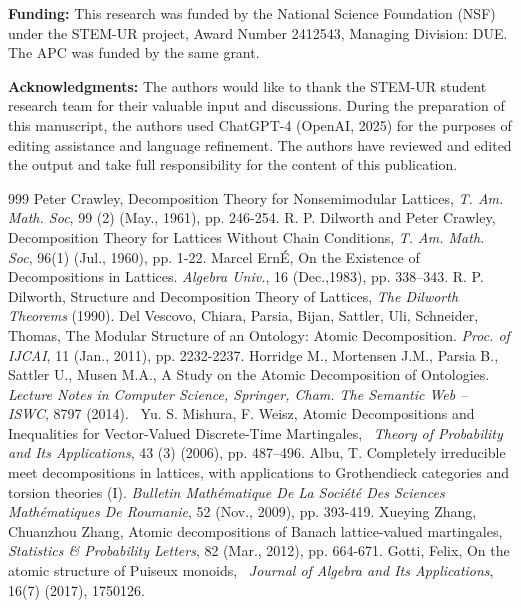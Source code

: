 \documentclass[12pt]{extarticle}
\begin{document}
\noindent\textbf{Funding: }This research was funded by the National Science Foundation (NSF) under the STEM-UR project, Award Number 2412543, Managing Division: DUE. The APC was funded by the same grant.

\noindent\textbf{Acknowledgments:}	The authors would like to thank the STEM-UR student research team for their valuable input and discussions. During the preparation of this manuscript, the authors used ChatGPT-4 (OpenAI, 2025) for the purposes of editing assistance and language refinement. The authors have reviewed and edited the output and take full responsibility for the content of this publication.


\begin{thebibliography}{999}
 Peter Crawley, Decomposition Theory for Nonsemimodular Lattices, \textit{T. Am. Math. Soc}, 99 (2) (May., 1961), pp. 246-254.
 R. P. Dilworth and Peter Crawley, Decomposition Theory for Lattices Without Chain Conditions, \textit{T. Am. Math. Soc}, 96(1) (Jul., 1960), pp. 1-22.
 Marcel ErnÉ, On the Existence of Decompositions in Lattices. \textit{Algebra Univ.}, 16 (Dec.,1983), pp. 338–343.
 R. P. Dilworth, Structure and Decomposition Theory of Lattices, \textit{The Dilworth Theorems} (1990).
 Del Vescovo, Chiara, Parsia, Bijan, Sattler, Uli, Schneider, Thomas, The Modular Structure of an Ontology: Atomic Decomposition. \textit{ Proc. of IJCAI}, 11 (Jan., 2011), pp. 2232-2237.
 Horridge M., Mortensen J.M., Parsia B., Sattler U., Musen M.A., A Study on the Atomic Decomposition of Ontologies. \textit{Lecture Notes in Computer Science, Springer, Cham. The Semantic Web – ISWC}, 8797 (2014). 
 Yu. S. Mishura, F. Weisz, Atomic Decompositions and Inequalities for Vector-Valued Discrete-Time Martingales,  \textit{Theory of Probability and Its Applications},  43 (3) (2006), pp. 487–496.
 Albu, T. Completely irreducible meet decompositions in lattices, with applications to Grothendieck categories and torsion theories (I). \textit{Bulletin Math\'{e}matique De La Soci\'{e}t\'{e} Des Sciences Math\'{e}matiques De Roumanie}, 52 (Nov., 2009), pp. 393-419.
 Xueying Zhang, Chuanzhou Zhang,
Atomic decompositions of Banach lattice-valued martingales,
\textit{Statistics \& Probability Letters},
82 (Mar., 2012), pp. 664-671.
 Gotti, Felix, On the atomic structure of Puiseux monoids,  \textit{Journal of Algebra and Its Applications}, 16(7) (2017), 1750126.


\end{thebibliography}
\end{document}
